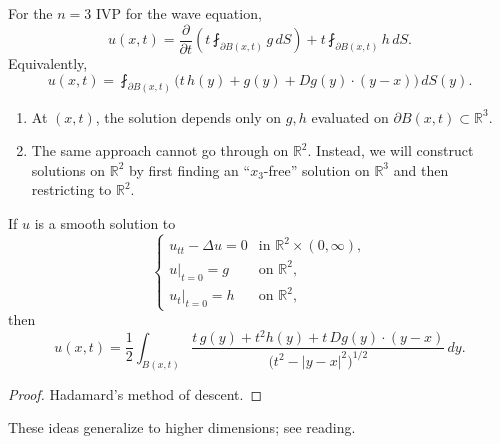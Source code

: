 \begin{theorem}
For the $n=3$ IVP for the wave equation,
$$
u(x,t)
=
\frac{\partial}{\partial t}
\left(
t\fint_{\partial B(x,t)} g\,dS
\right)
+
t\fint_{\partial B(x,t)} h\,dS.
$$
Equivalently,
$$
u(x,t)
=
\fint_{\partial B(x,t)}
\bigl(
t\,h(y)+g(y)+Dg(y)\cdot (y-x)
\bigr)\,dS(y).
$$
\end{theorem}


\begin{remark}
\begin{enumerate}\
    \item At $(x,t)$, the solution depends only on $g,h$ evaluated on
    $
    \partial B(x,t)\subset \mathbb{R}^3.
    $
    \item The same approach cannot go through on $\mathbb{R}^2$.
    Instead, we will construct solutions on $\mathbb{R}^2$ by first finding an
    ``$x_3$-free'' solution on $\mathbb{R}^3$ and then restricting to $\mathbb{R}^2$.
\end{enumerate}
\end{remark}


\begin{theorem}
If $u$ is a smooth solution to
$$
\begin{cases}
u_{tt}-\Delta u=0 & \text{in } \mathbb{R}^2\times (0,\infty),\\
u|_{t=0}=g & \text{on } \mathbb{R}^2,\\
u_t|_{t=0}=h & \text{on } \mathbb{R}^2,
\end{cases}
$$
then
$$
u(x,t)
=
\frac12
\int_{B(x,t)}
\frac{t\,g(y)+t^2 h(y)+t\,Dg(y)\cdot (y-x)}
{\bigl(t^2-|y-x|^2\bigr)^{1/2}}
\,dy.
$$
\end{theorem}

\begin{proof}
Hadamard's method of descent.
\end{proof}

\begin{remark}
These ideas generalize to higher dimensions; see reading.
\end{remark}

